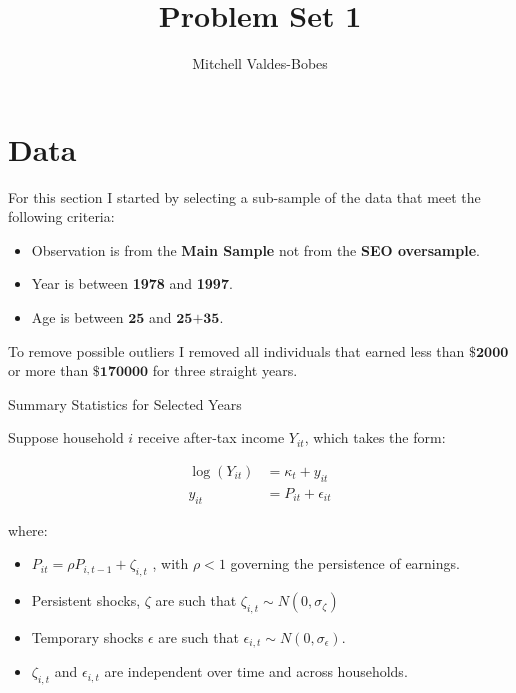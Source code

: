 \documentclass[12pt]{article}
\begin{document}
\title{Problem Set 1 }
\author{Mitchell Valdes-Bobes}
\maketitle



\section{Data}

For this section I started by selecting a sub-sample of the data that meet the following criteria:
\begin{itemize}
    \item Observation is from the \textbf{Main Sample} not from the \textbf{SEO oversample}.
    \item Year is between \textbf{1978} and \textbf{1997}.
    \item Age is between $\textbf{25}$ and $\textbf{25+35}$.
\end{itemize}

To remove possible outliers I removed all individuals that earned less than $\textbf{\$2000}$ or more than $\textbf{\$170000}$ for three straight years. 

\begin{center}
\begin{table}[h!]\caption{Summary Statistics for Selected Years}

\end{table}
\end{center}
Suppose household $i$ receive after-tax income $Y_{i t}$, which takes the form:

\begin{align*}
    \log \left(Y_{i t}\right) &=\kappa_{t}+y_{i t} \\
    y_{i t} &=P_{i t}+\epsilon_{i t}
\end{align*}

where:
\begin{itemize}
    \item $P_{i t}=\rho P_{i, t-1}+\zeta_{i, t}$ , with $\rho<1$ governing the persistence of earnings. 
    \item Persistent shocks, $\zeta$ are such that $\zeta_{i, t} \sim N\left(0, \sigma_{\zeta}\right)$
    \item Temporary shocks $\epsilon$ are such that  $\epsilon_{i, t} \sim N\left(0, \sigma_{\epsilon}\right)$. 
    \item $\zeta_{i, t}$ and $\epsilon_{i, t}$ are independent over time and across households.
\end{itemize}
\end{document}
